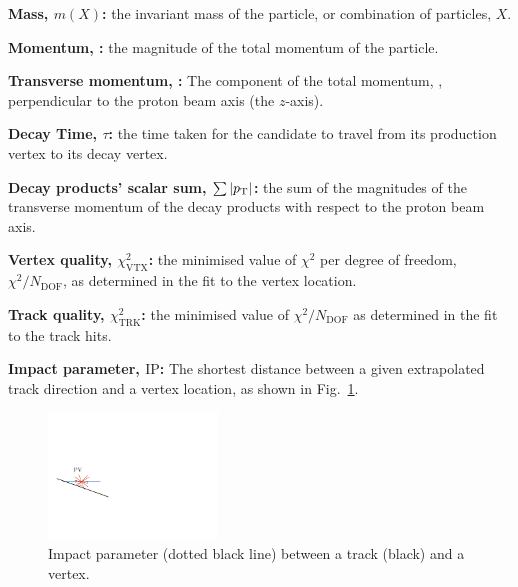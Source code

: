 \begin{description}
\item \textbf{Mass, $m(X)$:} the invariant mass of the particle, or combination of particles, $X$. 
\item \textbf{Momentum, \ptot:} the magnitude of the total momentum of the particle.
\item \textbf{Transverse momentum, \pt:} The component of the total momentum, \ptot, perpendicular to the proton beam axis (the $z$-axis).
\item \textbf{Decay Time, $\tau$:} the time taken for the candidate to travel from its production vertex to its decay vertex.
\item \textbf{Decay products' \pt scalar sum, $\sum{|\pt|}$:} the sum of the magnitudes of the transverse momentum of the decay products with respect to the proton beam axis.
\item \textbf{Vertex quality, $\chi^{2}_{\text{VTX}}$:} the minimised value of $\chi^{2}$ per degree of freedom, $\chi^{2}/N_{\text{DOF}}$, as determined in the fit to the vertex location.
\item \textbf{Track quality, $\chi^{2}_{\text{TRK}}$:} the minimised value of $\chi^{2}/N_{\text{DOF}}$ as determined in the fit to the track hits.
\item \textbf{Impact parameter, $\text{IP}$:} The shortest distance between a given extrapolated track direction and a vertex location, as shown in Fig.~\ref{fig:impact_parameter}. 

\begin{figure}[!h]
    \centering
    \includegraphics[width=0.4\textwidth]{figs/Selection/Impact_parameter.pdf}
    \caption{Impact parameter (dotted black line) between a track (black) and a vertex.}
    \label{fig:impact_parameter}   
\end{figure}


\end{description}
